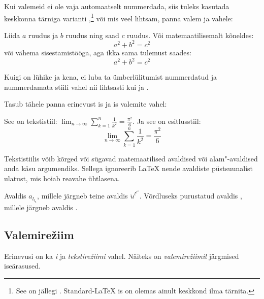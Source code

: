Kui valemeid ei ole vaja automaatselt nummerdada, siis tuleks kasutada
keskkonna  tärniga varianti
,\footnote{See on jällegi . Standard-\LaTeX
is on olemas ainult keskkond  ilma
tärnita.} või mis veel
lihtsam, panna valem \ci{[} ja \ci{]} vahele:
\begin{example}
Liida $a$ ruudus ja $b$ ruudus
ning saad $c$ ruudus. Või
matemaatilisemalt kõneldes:
 \begin{equation*}
   a^2 + b^2 = c^2
 \end{equation*}
või vähema sisestamistööga,
aga ikka sama tulemust saades:
 \[ a^2 + b^2 = c^2 \]
\end{example}
Kuigi \ci{[} on lühike ja kena, ei luba ta ümberlülitumist nummerdatud ja
nummerdamata stiili vahel nii lihtsasti kui  ja
.

Tasub tähele panna erinevust is ja is
valemite vahel:
\begin{example}
See on tekstistiil:
$\lim_{n \to \infty}
 \sum_{k=1}^n \frac{1}{k^2}
 = \frac{\pi^2}{6}$.
Ja see on esitlusstiil:
 \begin{equation}
  \lim_{n \to \infty}
  \sum_{k=1}^n \frac{1}{k^2}
  = \frac{\pi^2}{6}
 \end{equation}
\end{example}

Tekstistiilis võib kõrged või sügavad matemaatilised avaldised või
alam"-avaldised anda käsu  argumendiks. Sellega ignoreerib
\LaTeX{} nende avaldiste püstsuunalist ulatust, mis hoiab reavahe
ühtlasena.

\begin{example}
Avaldis $a_{l_{l_a}}$, millele
järgneb teine avaldis
$\ddot u^{l^{e^s}}$. Võrdluseks
purustatud avaldis
, millele
järgneb avaldis
.
\end{example}

\subsection{Valemire\v{z}iim}

Erinevusi on ka \emph{i} ja
\emph{tekstire\v{z}iimi} vahel. Näiteks on \emph{valemire\v{z}iimil}
järgmised iseärasused.

